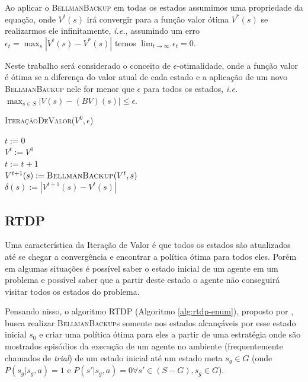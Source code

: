 \documentclass[letterpaper]{article}
\begin{document}
Ao aplicar o \textsc{BellmanBackup} em todas os estados assumimos uma propriedade da equação, onde $V^t(s)$ irá convergir para a função valor ótima $V^*(s)$ se realizarmos ele infinitamente, \textit{i.e.}, assumindo um erro $\epsilon_t = \max_s |V^t(s)-V^*(s)|$ temos $\lim_{t \rightarrow \infty} \epsilon_t = 0$.

Neste trabalho será considerado o conceito de $\epsilon$-otimalidade, onde a função valor é ótima se a diferença do valor atual de cada estado e a aplicação de um novo \textsc{BellmanBackup} nele for menor que $\epsilon$ para todos os estados, \textit{i.e.} $ \max_{s \in S} | V(s) - (BV)(s) | \leq \epsilon $.

\linesnumbered
\dontprintsemicolon
\begin{algorithm}[t!]
{
	\caption{\textsc{IteraçãoDeValor}($ V^0, \epsilon $)}
	\label{alg:iteracao-valor}
    $t := 0$\\
    $V^t := V^0$\\

    {
        $t := t + 1$\\

        {
            $V^{t+1}(s) := \textsc{BellmanBackup}(V^{t}, s)$ \\
            $\delta(s) := | V^{t+1}(s) - V^t(s) | $
        }
    }

}
\end{algorithm}


\subsection{RTDP}

Uma característica da Iteração de Valor é que todos os estados são atualizados até se chegar a convergência e encontrar a política ótima para todos eles. Porém em algumas situações é possível saber o estado inicial de um agente em um problema e possível saber que a partir deste estado o agente não conseguirá visitar todos os estados do problema.

Pensando nisso, o algoritmo RTDP (Algoritmo \ref{alg:rtdp-enum}), proposto por \cite{BartoBradtkeSingh-1995}, busca realizar \textsc{BellmanBackup}s somente nos estados alcançáveis por esse estado inicial $s_0$ e criar uma política ótima para eles a partir de uma estratégia onde são mostrados episódios da execução de um agente no ambiente (frequentemente chamados de \emph{trial}) de um estado inicial até um estado meta $s_g \in G$ (onde $P(s_g|s_g,a) = 1$ e $P(s'|s_g,a) = 0 \forall s' \in (S - G), s_g \in G$).
\end{document}
